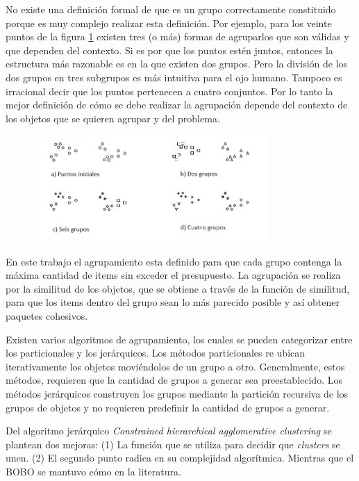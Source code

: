 No existe una definición formal de que es un grupo correctamente constituido porque es muy complejo realizar esta definición. Por ejemplo, para los veinte puntos de la figura \ref{res:img-howToCluster} existen tres (o más) formas de agruparlos que son válidas y que dependen del contexto. Si es por que los puntos estén juntos, entonces la estructura más razonable es en la que existen dos grupos. Pero la división de los dos grupos en tres subgrupos es más intuitiva para el ojo humano. Tampoco es irracional decir que los puntos pertenecen a cuatro conjuntos. Por lo tanto la mejor definición de cómo se debe realizar la agrupación depende del contexto de los objetos que se quieren agrupar y del problema.

\begin{figure}[H]
  \centering
   \includegraphics[width=0.8\textwidth]{img/howToCluster.png}
   \caption{}
   \label{res:img-howToCluster}
\end{figure}
En este trabajo el agrupamiento esta definido para que cada grupo contenga la máxima cantidad de items sin exceder el presupuesto. La agrupación se realiza por la similitud de los objetos, que se obtiene a través de la función de similitud, para que los items dentro del grupo sean lo más parecido posible y así obtener paquetes cohesivos.

Existen varios algoritmos de agrupamiento, los cuales se pueden categorizar entre los particionales y los jerárquicos. Los métodos particionales re ubican iterativamente los objetos moviéndolos de un grupo a otro. Generalmente, estos métodos, requieren que la cantidad de grupos a generar sea preestablecido. Los métodos jerárquicos construyen los grupos mediante la partición recursiva de los grupos de objetos y no requieren predefinir la cantidad de grupos a generar.

Del algoritmo jerárquico \textit{Constrained hierarchical agglomerative clustering} se plantean dos mejoras: (1) La función que se utiliza para decidir que \textit{clusters} se unen. (2) El segundo punto radica en su complejidad algorítmica. Mientras que el BOBO se mantuvo cómo en la literatura.

